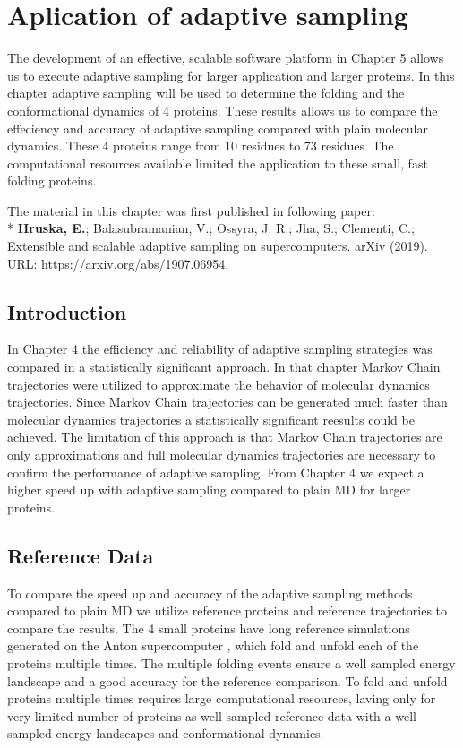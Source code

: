 \afterpage{\null\newpage}
\chapter{Aplication of adaptive sampling\label{ch:chapter5}}

The development of an effective, scalable software platform in Chapter 5 allows us to execute adaptive sampling for larger application and larger proteins.
In this chapter adaptive sampling will be used to determine the folding and the conformational dynamics of 4 proteins. These results allows us to compare the effeciency and accuracy of adaptive sampling compared with plain molecular dynamics.  These 4 proteins range from 10 residues to 73 residues. The computational resources available limited the application to these small, fast folding proteins. 

The material in this chapter was first published in following paper: 
\\*
\cite{Extasy2019} \textbf{Hruska, E.}; Balasubramanian, V.; Ossyra, J. R.; Jha, S.; Clementi, C.; Extensible
and scalable adaptive sampling on supercomputers. arXiv (2019). URL: https://arxiv.org/abs/1907.06954.


\section{\label{sec:intro5}Introduction}
  
In Chapter 4 the efficiency and reliability of adaptive sampling strategies was compared in a statistically significant approach.  In that chapter Markov Chain trajectories were utilized to approximate the behavior of molecular dynamics trajectories. Since Markov Chain trajectories can be generated much faster than molecular dynamics trajectories a statistically significant reesults could be achieved. The limitation of this approach is that Markov Chain trajectories are only approximations and full molecular dynamics trajectories are necessary to confirm the performance of adaptive sampling. From Chapter 4 we expect a higher speed up with adaptive sampling\cite{Adstrategies2018} compared to plain MD for larger proteins.

\section{\label{sec:Reference}Reference Data}



To compare the speed up and accuracy of the adaptive sampling methods compared to plain MD we utilize reference proteins and reference trajectories to compare the results.
The 4 small proteins have long reference simulations generated on the Anton supercomputer \cite{lindorff2011}, which fold and unfold each of the proteins multiple times. The multiple folding events ensure a well sampled energy landscape and a good accuracy for the reference comparison. To fold and unfold proteins multiple times requires large computational resources, laving only for very limited number of proteins as well sampled reference data with a well sampled energy landscapes and conformational dynamics.

